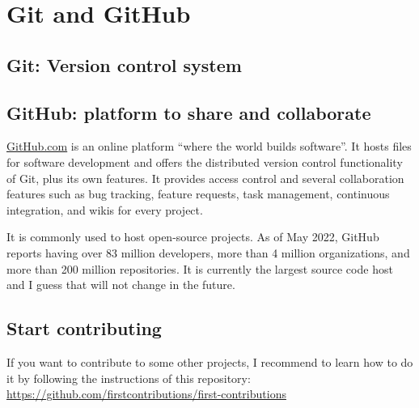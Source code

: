 \chapter{Git and GitHub}\label{ch:git}

\section{Git: Version control system}

\section{GitHub: platform to share and collaborate}
\url{GitHub.com} is an online platform ``where the world builds software''. It hosts files for software development and offers the distributed version control functionality of Git, plus its own features. It provides access control and several collaboration features such as bug tracking, feature requests, task management, continuous integration, and wikis for every project.

It is commonly used to host open-source projects. As of May 2022, GitHub reports having over 83 million developers, more than 4 million organizations, and more than 200 million repositories. It is currently the largest source code host and I guess that will not change in the future. 


\section{Start contributing}

If you want to contribute to some other projects, I recommend to learn how to do it by following the instructions of this repository: \url{https://github.com/firstcontributions/first-contributions}

